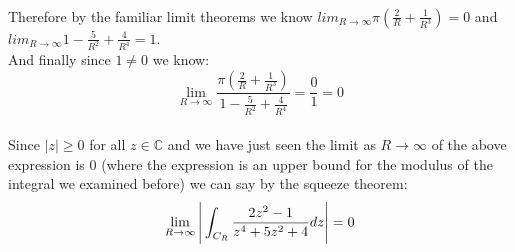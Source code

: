 \documentclass{article}
\begin{document}
\begin{center}
    \\Therefore by the familiar limit theorems we know $lim _{R\rightarrow\infty}\pi(\frac{2}{R} +\frac{1}{R^3}) = 0$ and $lim _{R\rightarrow\infty} 1 -\frac{5}{R^2} +\frac{4}{R^4} = 1$.
    \\And finally since $1\neq 0$ we know:
    \[\lim _{R\rightarrow\infty}\frac{\pi (\frac{2}{R} +\frac{1}{R^3})}{1 -\frac{5}{R^2} +\frac{4}{R^4}} =\frac{0}{1} = 0\]
    \\Since $|z|\geq 0$ for all $z\in\mathbb{C}$ and we have just seen the limit as $R\rightarrow\infty$ of the above expression is 0 (where the expression is an upper bound for the modulus of the integral we examined before) we can say by the squeeze theorem:
    \[\lim _{R\rightarrow\infty}\Bigg{|}\int _{C_R}\frac{2z^2 - 1}{z^4 + 5z^2 + 4} dz\Bigg{|} = 0\]
    \qedsymbol
\end{center}
\end{document}
